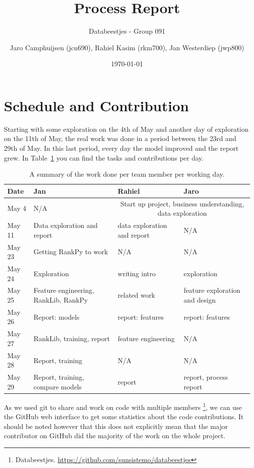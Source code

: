 \documentclass[runningheads,a4paper]{llncs}
\author{Jaro Camphuijsen (jcn690), Rahiel Kasim (rkm700), Jan Westerdiep (jwp800)}
\date{\today}
\title{Process Report}
\subtitle{Databeestjes - Group 091}
\begin{document}
\maketitle

\section{Schedule and Contribution}
Starting with some exploration on the 4th of May and another day of exploration on the 11th of May, the real work was done in a period between the 23rd and 29th of May. In this last period, every day the model improved and the report grew. In Table~\ref{table:schedule} you can find the tasks and contributions per day. 

\begin{table}
\centering
    \begin{tabular}{ l||l|l|l }    
    \toprule
    \textbf{Date}                	& \textbf{Jan}                & \textbf{Rahiel}   			& \textbf{Jaro}                      \\ \midrule
May 4 & N/A & \multicolumn{2}{c}{Start up project, business understanding, data exploration} \\
May 11& Data exploration and report & data exploration and report & N/A \\
May 23& Getting RankPy to work & N/A & N/A\\
May 24& Exploration & writing intro & exploration \\
May 25& Feature engineering, RankLib, RankPy & related work & feature exploration and design \\
May 26& Report: models & report: features & report: features \\
May 27& RankLib, training, report & feature engineering & N/A \\
May 28& Report, training & N/A & N/A\\
May 29& Report, training, compare models & report & report, process report \\ \bottomrule
    \end{tabular}
    \caption{A summary of the work done per team member per working day.}
	\label{table:schedule}
\end{table}

As we used git to share and work on code with multiple members \footnote{Databeestjes. \url{https://github.com/sunsistemo/databeestjes}}, we can use the GitHub web interface to get some statistics about the code contributions. It should be noted however that this does not explicitly mean that the major contributor on GitHub did the majority of the work on the whole project.
\end{document}
